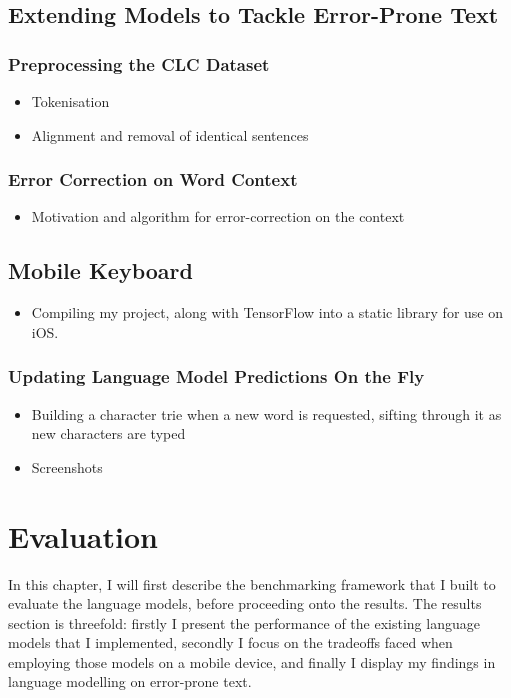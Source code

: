 \documentclass[a4paper, 12pt]{report}
\begin{document}
\section{Extending Models to Tackle Error-Prone Text} \label{error_correcting_lm}
\subsection{Preprocessing the CLC Dataset}
\begin{itemize}
\item
	Tokenisation
\item
	Alignment and removal of identical sentences
\end{itemize}
\subsection{Error Correction on Word Context}
\begin{itemize}
\item
	Motivation and algorithm for error-correction on the context
\end{itemize}
\section{Mobile Keyboard} \label{mobile_keyboard}
\begin{itemize}
\item
	Compiling my project, along with TensorFlow into a static library for use on iOS.
\end{itemize}
\subsection{Updating Language Model Predictions On the Fly}
\begin{itemize}
\item
	Building a character trie when a new word is requested, sifting through it as new characters are typed
\item
	Screenshots
\end{itemize}

\chapter{Evaluation}

In this chapter, I will first describe the benchmarking framework that I built to evaluate the language models, before proceeding onto the results. The results section is threefold: firstly I present the performance of the existing language models that I implemented, secondly I focus on the tradeoffs faced when employing those models on a mobile device, and finally I display my findings in language modelling on error-prone text.
\end{document}
